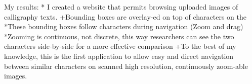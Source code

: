                 
                    My results:
        *  I created a website that permits browsing uploaded images of calligraphy texts.
            +Bounding boxes are overlay-ed on top of characters on the 
                *These bounding boxes follow characters during navigation (Zoom and drag)
                *Zooming is continuous, not discrete, this way researchers can see the two characters side-by-side for a more effective comparison
            +To the best of my knowledge, this is the first application to allow easy and direct navigation between similar characters on scanned high resolution, continuously zoom-able images.
